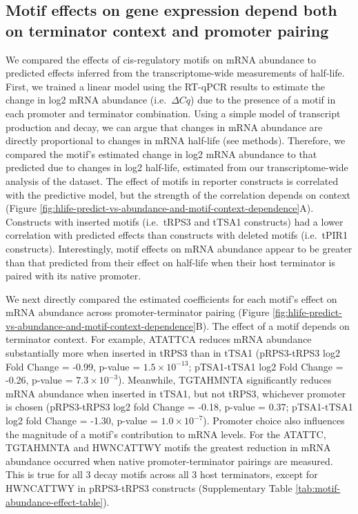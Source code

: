\documentclass[../main.tex]{subfiles}
\begin{document}
\subsection{Motif effects on gene expression depend both on terminator context and promoter pairing}

We compared the effects of cis-regulatory motifs on mRNA abundance to predicted effects inferred from the transcriptome-wide measurements of half-life.
First, we trained a linear model using the RT-qPCR results to estimate the change in log2 mRNA abundance (i.e.~\(\Delta Cq\)) due to the presence of a motif in each promoter and terminator combination.
Using a simple model of transcript production and decay, we can argue that changes in mRNA abundance are directly proportional to changes in mRNA half-life (see methods).
Therefore, we compared the motif's estimated change in log2 mRNA abundance to that predicted due to changes in log2 half-life, estimated from our transcriptome-wide analysis of the \parencite{Chan2018} dataset.
The effect of motifs in reporter constructs is correlated with the predictive model, but the strength of the correlation depends on context (Figure \ref{fig:hlife-predict-vs-abundance-and-motif-context-dependence}A).
Constructs with inserted motifs (i.e.~tRPS3 and tTSA1 constructs) had a lower correlation with predicted effects than constructs with deleted motifs (i.e.~tPIR1 constructs).
Interestingly, motif effects on mRNA abundance appear to be greater than that predicted from their effect on half-life when their host terminator is paired with its native promoter.

We next directly compared the estimated coefficients for each motif's effect on mRNA abundance across promoter-terminator pairing (Figure \ref{fig:hlife-predict-vs-abundance-and-motif-context-dependence}B).
The effect of a motif depends on terminator context.
For example, ATATTCA reduces mRNA abundance substantially more when inserted in tRPS3 than in tTSA1 (pRPS3-tRPS3 log2 Fold Change = -0.99, p-value = \(1.5 \times 10^{-13}\); pTSA1-tTSA1 log2 Fold Change = -0.26, p-value = \(7.3 \times10^{-3}\)).
Meanwhile, TGTAHMNTA significantly reduces mRNA abundance when inserted in tTSA1, but not tRPS3, whichever promoter is chosen (pRPS3-tRPS3 log2 fold Change = -0.18, p-value = 0.37; pTSA1-tTSA1 log2 fold Change = -1.30, p-value = \(1.0 \times10^{-7}\)).
Promoter choice also influences the magnitude of a motif's contribution to mRNA levels.
For the ATATTC, TGTAHMNTA and HWNCATTWY motifs the greatest reduction in mRNA abundance occurred when native promoter-terminator pairings are measured.
This is true for all 3 decay motifs across all 3 host terminators, except for HWNCATTWY in pRPS3-tRPS3 constructs (Supplementary Table \ref{tab:motif-abundance-effect-table}).
\end{document}
